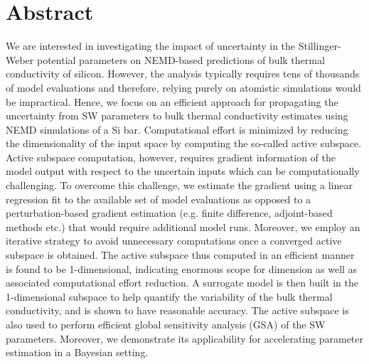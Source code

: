 \section*{Abstract}
We are interested in investigating the impact of uncertainty in the
Stillinger-Weber potential parameters on NEMD-based predictions of bulk
thermal conductivity of silicon. 
However, the analysis typically requires tens of thousands of model evaluations
and therefore, relying purely on atomistic simulations would be impractical.
Hence, we focus on an efficient approach for propagating the 
uncertainty from SW parameters
to bulk thermal conductivity estimates using NEMD simulations of a Si bar.
Computational effort is minimized by reducing the
dimensionality of the input space by computing the so-called active subspace.
Active subspace computation, however, requires gradient information of
the model output with respect to the uncertain inputs which can be
computationally challenging. To overcome this challenge, we estimate the
gradient using a linear regression fit to the available set of
model evaluations as opposed to a perturbation-based gradient estimation
(e.g. finite difference, adjoint-based methods etc.) 
that would require additional model runs. Moreover, 
we employ an iterative strategy to avoid unnecessary computations once
a converged active subspace is obtained.
The active subspace thus computed in an efficient manner is found to be
1-dimensional, indicating enormous scope for dimension as well as
associated computational effort reduction. A surrogate model is 
then built in the 1-dimensional subspace to help quantify
the variability of the bulk thermal conductivity, and is shown to have
reasonable accuracy. The
active subspace is also used to perform efficient global sensitivity analysis (GSA)
of the SW parameters. Moreover, we demonstrate its applicability for accelerating
parameter estimation in a Bayesian setting.  

